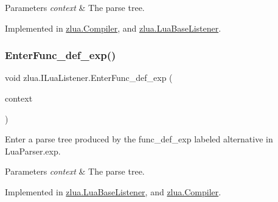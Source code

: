 \begin{DoxyParams}{Parameters}
{\em context} & The parse tree.\\
\hline
\end{DoxyParams}


Implemented in \mbox{\hyperlink{classzlua_1_1_compiler_a8a7c628a67d4fbca64f86739a32b1162}{zlua.\+Compiler}}, and \mbox{\hyperlink{classzlua_1_1_lua_base_listener_aeae8e0a0ca7fe9c5a24cb372585b81b7}{zlua.\+Lua\+Base\+Listener}}.

\mbox{\label{interfacezlua_1_1_i_lua_listener_a4f05c6d0e5bd9d2515029fd34d8f5402}} 
\subsubsection{\texorpdfstring{Enter\+Func\+\_\+def\+\_\+exp()}{EnterFunc\_def\_exp()}}
{\footnotesize\ttfamily void zlua.\+I\+Lua\+Listener.\+Enter\+Func\+\_\+def\+\_\+exp (\begin{DoxyParamCaption}\item[{\mbox{[}\+Not\+Null\mbox{]} \mbox{\hyperlink{classzlua_1_1_lua_parser_1_1_func__def__exp_context}{Lua\+Parser.\+Func\+\_\+def\+\_\+exp\+Context}}}]{context }\end{DoxyParamCaption})}



Enter a parse tree produced by the {\ttfamily func\+\_\+def\+\_\+exp} labeled alternative in Lua\+Parser.\+exp. 


\begin{DoxyParams}{Parameters}
{\em context} & The parse tree.\\
\hline
\end{DoxyParams}


Implemented in \mbox{\hyperlink{classzlua_1_1_lua_base_listener_ace1992dcf21cf3eff2428f67de5f3595}{zlua.\+Lua\+Base\+Listener}}, and \mbox{\hyperlink{classzlua_1_1_compiler_a626c3684acd46bdc1812ebd74d2ce10e}{zlua.\+Compiler}}.

\mbox{\label{interfacezlua_1_1_i_lua_listener_a2f03132612731ef3355f1453b3cb4686}} 

